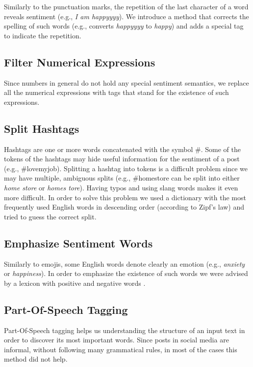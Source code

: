 Similarly to the punctuation marks, the repetition of the last character of a word reveals sentiment (e.g., \textit{I am happyyyy}). We introduce a method that corrects the spelling of such words (e.g., converts \textit{happyyyy} to \textit{happy}) and adds a special tag to indicate the repetition.

\subsection{Filter Numerical Expressions}
Since numbers in general do not hold any special sentiment semantics,  
we replace all the numerical expressions with tags that stand for the existence of such expressions. 

\subsection{Split Hashtags}
Hashtags are one or more words concatenated with the symbol \#.
Some of the tokens of the hashtags may hide useful information for the sentiment of a post (e.g., \#lovemyjob).
Splitting a hashtag into tokens is a difficult problem \cite{Khaitan:2009:DCS:1645953.1645982} since we may have multiple, ambiguous splits (e.g., \#homestore can be split into either \textit{home store} or \textit{homes tore}). 
Having typos and using slang words makes it even more difficult.
In order to solve this problem we used a dictionary with the most frequently used English words in descending order (according to Zipf's law) and tried to guess the correct split.


\subsection{Emphasize Sentiment Words}
Similarly to emojis, some English words denote clearly an emotion (e.g., \textit{anxiety} or \textit{happiness}). In order to emphasize the existence of such words
we were advised by a lexicon with positive and negative words \cite{hu2004mining}. 


\subsection{Part-Of-Speech Tagging}
Part-Of-Speech tagging helps us understanding the structure of an input text in order to discover its most important words.
Since posts in social media are informal, without following many grammatical rules, 
in most of the cases this method did not help.

